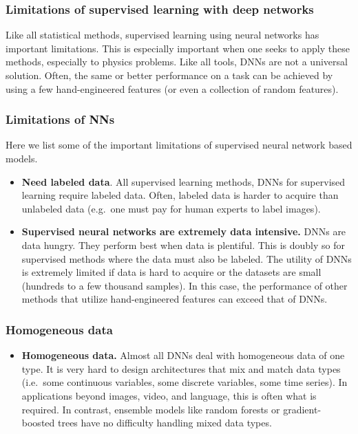 \documentclass{beamer}
\begin{document}
\begin{frame}
\frametitle{Limitations of supervised learning with deep networks}

Like all statistical methods, supervised learning using neural
networks has important limitations. This is especially important when
one seeks to apply these methods, especially to physics problems. Like
all tools, DNNs are not a universal solution. Often, the same or
better performance on a task can be achieved by using a few
hand-engineered features (or even a collection of random
features).
\end{frame}

\begin{frame}
\frametitle{Limitations of NNs}

Here we list some of the important limitations of supervised neural network based models. 

\begin{itemize}
\item \textbf{Need labeled data}. All supervised learning methods, DNNs for supervised learning require labeled data. Often, labeled data is harder to acquire than unlabeled data (e.g.~one must pay for human experts to label images).

\item \textbf{Supervised neural networks are extremely data intensive.} DNNs are data hungry. They perform best when data is plentiful. This is doubly so for supervised methods where the data must also be labeled. The utility of DNNs is extremely limited if data is hard to acquire or the datasets are small (hundreds to a few thousand samples). In this case, the performance of other methods that utilize hand-engineered features can exceed that of DNNs.
\end{itemize}

\noindent
\end{frame}

\begin{frame}
\frametitle{Homogeneous data}

\begin{itemize}
\item \textbf{Homogeneous data.} Almost all DNNs deal with homogeneous data of one type. It is very hard to design architectures that mix and match data types (i.e.~some continuous variables, some discrete variables, some time series). In applications beyond images, video, and language, this is often what is required. In contrast, ensemble models like random forests or gradient-boosted trees have no difficulty handling mixed data types.
\end{itemize}

\noindent
\end{frame}
\end{document}
